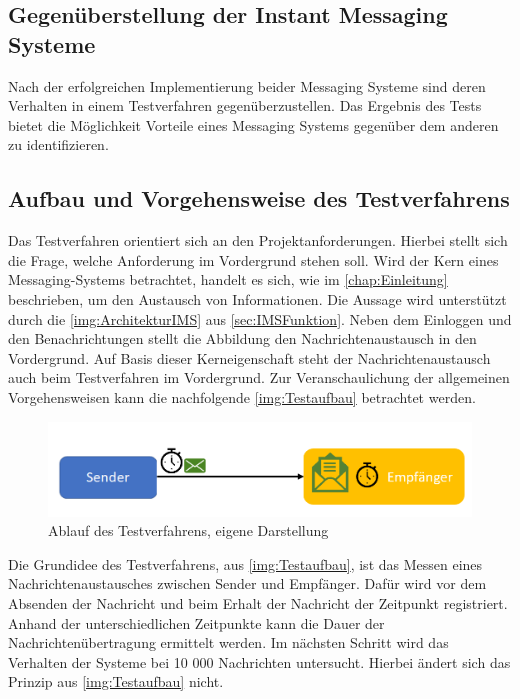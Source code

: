 \documentclass[a4paper,titlepage,halfparskip,12pt]{scrreprt}
\begin{document}
\begin{onehalfspacing}
\pagebreak


\chapter{Gegenüberstellung der Instant Messaging Systeme}
\label{chap:ComparisonXMPP_Kafka}
Nach der erfolgreichen Implementierung beider Messaging Systeme sind deren Verhalten in einem Testverfahren gegenüberzustellen. Das Ergebnis des Tests bietet die Möglichkeit Vorteile eines Messaging Systems gegenüber dem anderen zu identifizieren.

\section{Aufbau und Vorgehensweise des Testverfahrens}
\label{sec:AufbauVorgehenTest}
Das Testverfahren orientiert sich an den Projektanforderungen. Hierbei stellt sich die Frage, welche Anforderung im Vordergrund stehen soll. Wird der Kern eines Messaging-Systems betrachtet, handelt es sich, wie im \autoref{chap:Einleitung} beschrieben, um den Austausch von Informationen. Die Aussage wird unterstützt durch die \autoref{img:ArchitekturIMS} aus \autoref{sec:IMSFunktion}. Neben dem Einloggen und den Benachrichtungen stellt die Abbildung den Nachrichtenaustausch in den Vordergrund. Auf Basis dieser Kerneigenschaft steht der Nachrichtenaustausch auch beim Testverfahren im Vordergrund. Zur Veranschaulichung der allgemeinen Vorgehensweisen kann die nachfolgende \autoref{img:Testaufbau} betrachtet werden.
\begin{figure}[h]
	\centering
	\includegraphics[scale=0.75]{images/Testaufbau}
	\caption{Ablauf des Testverfahrens, eigene Darstellung}
	\label{img:Testaufbau}
\end{figure}
Die Grundidee des Testverfahrens, aus \autoref{img:Testaufbau}, ist das Messen eines Nachrichtenaustausches zwischen Sender und Empfänger. Dafür wird vor dem Absenden der Nachricht und beim Erhalt der Nachricht der Zeitpunkt registriert. Anhand der unterschiedlichen Zeitpunkte kann die Dauer der Nachrichtenübertragung ermittelt werden. Im nächsten Schritt wird das Verhalten der Systeme bei 10 000 Nachrichten untersucht. Hierbei ändert sich das Prinzip aus \autoref{img:Testaufbau} nicht.\\

\end{onehalfspacing}
\end{document}
